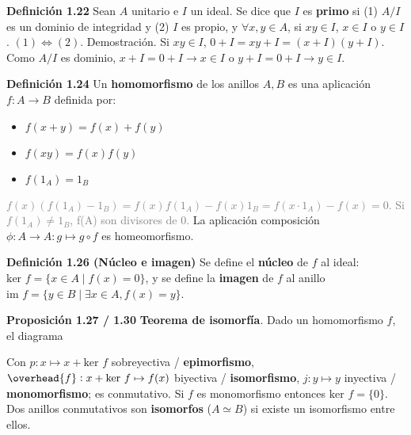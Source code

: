 \documentclass[a4paper, 11pt]{extarticle}
\newcommand{\propo}[1]{\textcolor{rojo}{\textbf{Proposición #1}}}
\newcommand{\defi}[1]{\textcolor{azul}{\textbf{Definición #1}}}
\newcommand{\dem}[1]{\textcolor{gris}{\small{Demostración. #1}}}
\begin{document}
\defi{1.22} Sean \(A\) unitario e \(I\) un ideal. Se dice que \(I\) es
\textbf{primo} si (1) \(A/I\) es un dominio de integridad y (2) \(I\) es propio, y
\(\forall x,y \in A\), si \(xy \in I\), \(x \in I\) o \(y \in I\). \((1) \iff (2)\).
\dem{ Si \( xy \in I  \), \( 0 + I = xy + I = (x+I)(y+I) \). Como \( A/I  \) es dominio, 
\( x+I = 0 + I \rightarrow x \in I \) o \( y+I = 0 + I \rightarrow y \in I  \).  }

\defi{1.24} Un \textbf{homomorfismo} de los anillos \(A,B\) es una aplicación \(f: A
\rightarrow B\) definida por: \vspace{-1em}
\begin{itemize}
\item \(f(x+y) = f(x) + f(y)\)
\item \(f(xy) = f(x)f(y)\)
\item \(f(1_A) = 1_B\)
\end{itemize}
\vspace{-1em}\textcolor{gray}{\footnotesize \( f(x) (f(1_A) - 1_B) = f(x)f(1_A) - f(x)1_B = f(x\cdot 1_A) - f(x) = 0 \). 
Si \( f(1_A) \neq 1_B \), f(A) son divisores de 0.}
La aplicación composición \(\phi: A \rightarrow A: g \mapsto g \circ f\) es
homeomorfismo. 

\defi{1.26 (Núcleo e imagen)} Se define el \textbf{núcleo} de \(f\) al ideal: \(\text{ker } f
= \{ x \in A \;|\; f(x) = 0 \}\), y se define la \textbf{imagen} de \(f\) al anillo \(\text{im } f = \{ y \in B \;|\; \exists x \in A, f(x) = y \}\).

\propo{1.27 / 1.30} \textbf{Teorema de isomorfía}. Dado un homomorfismo \(f\), el diagrama

\vspace{-1em}
\begin{center}
\end{center}
\vspace{-1em}
Con \(p: x \mapsto x + \text{ker }f\) sobreyectiva / \textbf{epimorfismo}, \(\overhead{f}: x +
\text{ker }f \mapsto f(x)\) biyectiva / \textbf{isomorfismo}, \(j: y \mapsto y\)
inyectiva / \textbf{monomorfismo}; es
conmutativo.  
Si \(f\) es monomorfismo entonces \(\text{ker }f = \{ 0 \}\). Dos anillos
conmutativos son \textbf{isomorfos} (\(A \simeq B\)) si existe un isomorfismo entre
ellos.
\end{document}
